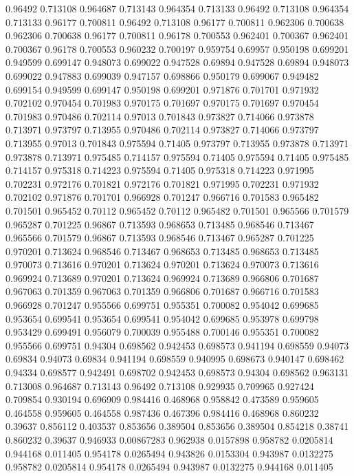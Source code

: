0.96492 0.713108
0.964687 0.713143
0.964354 0.713133
0.96492 0.713108
0.964354 0.713133
0.96177 0.700811
0.96492 0.713108
0.96177 0.700811
0.962306 0.700638
0.962306 0.700638
0.96177 0.700811
0.96178 0.700553
0.962401 0.700367
0.962401 0.700367
0.96178 0.700553
0.960232 0.700197
0.959754 0.69957
0.950198 0.699201
0.949599 0.699147
0.948073 0.699022
0.947528 0.69894
0.947528 0.69894
0.948073 0.699022
0.947883 0.699039
0.947157 0.698866
0.950179 0.699067
0.949482 0.699154
0.949599 0.699147
0.950198 0.699201
0.971876 0.701701
0.971932 0.702102
0.970454 0.701983
0.970175 0.701697
0.970175 0.701697
0.970454 0.701983
0.970486 0.702114
0.97013 0.701843
0.973827 0.714066
0.973878 0.713971
0.973797 0.713955
0.970486 0.702114
0.973827 0.714066
0.973797 0.713955
0.97013 0.701843
0.975594 0.71405
0.973797 0.713955
0.973878 0.713971
0.973878 0.713971
0.975485 0.714157
0.975594 0.71405
0.975594 0.71405
0.975485 0.714157
0.975318 0.714223
0.975594 0.71405
0.975318 0.714223
0.971995 0.702231
0.972176 0.701821
0.972176 0.701821
0.971995 0.702231
0.971932 0.702102
0.971876 0.701701
0.966928 0.701247
0.966716 0.701583
0.965482 0.701501
0.965452 0.70112
0.965452 0.70112
0.965482 0.701501
0.965566 0.701579
0.965287 0.701225
0.96867 0.713593
0.968653 0.713485
0.968546 0.713467
0.965566 0.701579
0.96867 0.713593
0.968546 0.713467
0.965287 0.701225
0.970201 0.713624
0.968546 0.713467
0.968653 0.713485
0.968653 0.713485
0.970073 0.713616
0.970201 0.713624
0.970201 0.713624
0.970073 0.713616
0.969924 0.713689
0.970201 0.713624
0.969924 0.713689
0.966806 0.701687
0.967063 0.701359
0.967063 0.701359
0.966806 0.701687
0.966716 0.701583
0.966928 0.701247
0.955566 0.699751
0.955351 0.700082
0.954042 0.699685
0.953654 0.699541
0.953654 0.699541
0.954042 0.699685
0.953978 0.699798
0.953429 0.699491
0.956079 0.700039
0.955488 0.700146
0.955351 0.700082
0.955566 0.699751
0.94304 0.698562
0.942453 0.698573
0.941194 0.698559
0.94073 0.69834
0.94073 0.69834
0.941194 0.698559
0.940995 0.698673
0.940147 0.698462
0.94334 0.698577
0.942491 0.698702
0.942453 0.698573
0.94304 0.698562
0.963131 0.713008
0.964687 0.713143
0.96492 0.713108
0.929935 0.709965
0.927424 0.709854
0.930194 0.696909
0.984416 0.468968
0.958842 0.473589
0.959605 0.464558
0.959605 0.464558
0.987436 0.467396
0.984416 0.468968
0.860232 0.39637
0.856112 0.403537
0.853656 0.389504
0.853656 0.389504
0.854218 0.38741
0.860232 0.39637
0.946933 0.00867283
0.962938 0.0157898
0.958782 0.0205814
0.944168 0.011405
0.954178 0.0265494
0.943826 0.0153304
0.943987 0.0132275
0.958782 0.0205814
0.954178 0.0265494
0.943987 0.0132275
0.944168 0.011405
